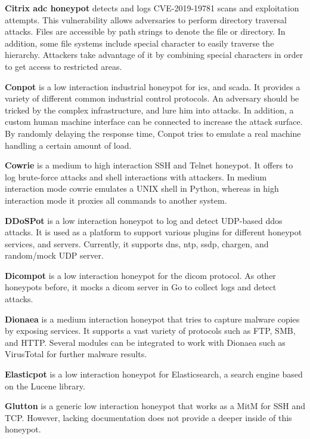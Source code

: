 \textbf{Citrix \ac{adc} honeypot} \cite{citrixhoneypot2020} detects and logs CVE-2019-19781\cite{CVE-2019-19781} scans and exploitation attempts.
This vulnerability allows adversaries to perform directory traversal attacks.
Files are accessible by path strings to denote the file or directory.
In addition, some file systems include special character to easily traverse the hierarchy.
Attackers take advantage of it by combining special characters in order to get access to restricted areas. \cite{flanders2019}

\textbf{Conpot} \cite{conpot2021} is a low interaction industrial honeypot for \ac{ics}, and \ac{scada}.
It provides a variety of different common industrial control protocols.
An adversary should be tricked by the complex infrastructure, and lure him into attacks.
In addition, a custom human machine interface can be connected to increase the attack surface.
By randomly delaying the response time, Conpot tries to emulate a real machine handling a certain amount of load.

\textbf{Cowrie} \cite{cowrie2021} is a medium to high interaction SSH and Telnet honeypot.
It offers to log brute-force attacks and shell interactions with attackers.
In medium interaction mode cowrie emulates a UNIX shell in Python, whereas in high interaction mode it proxies all commands to another system.

\textbf{DDoSPot} \cite{ddosspot2021} is a low interaction honeypot to log and detect UDP-based \ac{ddos} attacks.
It is used as a platform to support various plugins for different honeypot services, and servers.
Currently, it supports \acs{dns}, \acs{ntp}, \acs{ssdp}, \acs{chargen}, and random/mock UDP server.

\textbf{Dicompot} \cite{dicompot2021} is a low interaction honeypot for the \ac{dicom} protocol.
As other honeypots before, it mocks a \ac{dicom} server in Go to collect logs and detect attacks.

\textbf{Dionaea} \cite{dionaea2021} is a medium interaction honeypot that tries to capture malware copies by exposing services.
It supports a vast variety of protocols such as FTP, SMB, and HTTP.
Several modules can be integrated to work with Dionaea such as VirusTotal for further malware results.

\textbf{Elasticpot} \cite{elasticpot2021} is a low interaction honeypot for Elasticsearch, a search engine based on the Lucene library.

\textbf{Glutton} \cite{glutton2021} is a generic low interaction honeypot that works as a MitM for SSH and TCP.
However, lacking documentation does not provide a deeper inside of this honeypot.

